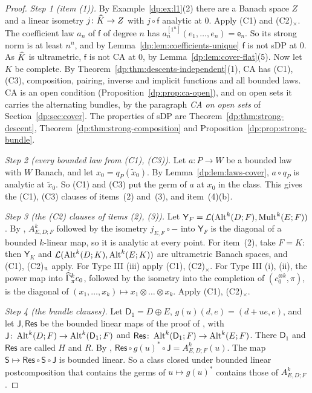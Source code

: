 \begin{proof}
\emph{Step 1 (item (1)).} By Example~\ref{dp:ex:l1}(2) there are a Banach space $Z$ and a linear isometry $j\colon\widehat K\to Z$ with $j\circ\mathsf f$ analytic at $0$. Apply (C1) and (C2)$_\times$. The coefficient law $a_n$ of $\mathsf f$ of degree $n$ has $a_n^{[1^n]}(e_1,\dots,e_n)=\mathsf e_n$. So its strong norm is at least $n^n$, and by Lemma~\ref{dp:lem:coefficients-unique} $\mathsf f$ is not sDP at $0$. As $\widehat K$ is ultrametric, $\mathsf f$ is not CA at $0$, by Lemma~\ref{dp:lem:cover-flat}(5). Now let $K$ be complete. By Theorem~\ref{dp:thm:descents-independent}(1), CA has (C1), (C3), composition, pairing, inverse and implicit functions and all bounded laws. CA is an open condition (Proposition~\ref{dp:prop:ca-open}), and on open sets it carries the alternating bundles, by the paragraph \emph{CA on open sets} of Section~\ref{dp:sec:cover}. The properties of sDP are Theorem~\ref{dp:thm:strong-descent}, Theorem~\ref{dp:thm:strong-composition} and Proposition~\ref{dp:prop:strong-bundle}.

\emph{Step 2 (every bounded law from \textup{(C1)}, \textup{(C3)}).} Let $a\colon P\to W$ be a bounded law with $W$ Banach, and let $x_0=q_P(\tilde x_0)$. By Lemma~\ref{dp:lem:laws-cover}, $a\circ q_P$ is analytic at $\tilde x_0$. So (C1) and (C3) put the germ of $a$ at $x_0$ in the class. This gives the (C1), (C3) clauses of items~(2) and~(3), and item~(4)(b).

\emph{Step 3 (the (C2) clauses of items (2), (3)).} Let $\mathsf Y_F=\mathcal L(\operatorname{Alt}^k(D;F),\operatorname{Mult}^k(E;F))$. By \cite[Proposition~2.2]{I}, $A^k_{E,D;F}$ followed by the isometry $j_{E,F}\circ{-}$ into $\mathsf Y_F$ is the diagonal of a bounded $k$\nobreakdash-linear map, so it is analytic at every point. For item~(2), take $F=K$: then $\mathsf Y_K$ and $\mathcal L(\operatorname{Alt}^k(D;K),\operatorname{Alt}^k(E;K))$ are ultrametric Banach spaces, and (C1), (C2)$_{\rm u}$ apply. For Type III (iii) apply (C1), (C2)$_\times$. For Type III (i), (ii), the power map into $\widehat\Gamma^k_\pi c_0$, followed by the isometry into the completion of $(c_0^{\otimes k},\pi)$, is the diagonal of $(x_1,\dots,x_k)\mapsto x_1\otimes\dots\otimes x_k$. Apply (C1), (C2)$_\times$.

\emph{Step 4 (the bundle clauses).} Let $\mathsf D_1=D\oplus E$, $g(u)(d,e)=(d+ue,e)$, and let $\mathsf J,\mathsf{Res}$ be the bounded linear maps of the proof of \cite[Proposition~10.1]{I}, with $\mathsf J\colon\operatorname{Alt}^k(D;F)\to\operatorname{Alt}^k(\mathsf D_1;F)$ and $\mathsf{Res}\colon\operatorname{Alt}^k(\mathsf D_1;F)\to\operatorname{Alt}^k(E;F)$. There $\mathsf D_1$ and $\mathsf{Res}$ are called $H$ and $R$. By \cite[(10.1)]{I}, $\mathsf{Res}\circ g(u)^*\circ\mathsf J=A^k_{E,D;F}(u)$. The map $\mathsf S\mapsto\mathsf{Res}\circ\mathsf S\circ\mathsf J$ is bounded linear. So a class closed under bounded linear postcomposition that contains the germs of $u\mapsto g(u)^*$ contains those of $A^k_{E,D;F}$.


\end{proof}
